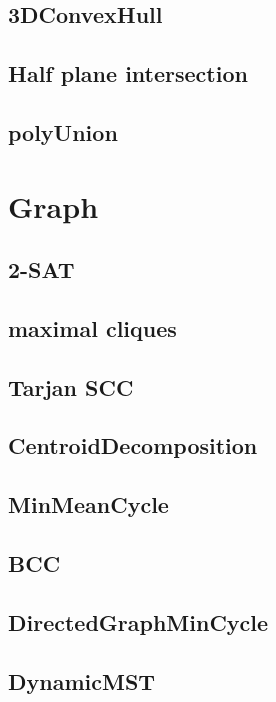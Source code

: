 \subsection{3DConvexHull}

\subsection{Half plane intersection}

\subsection{polyUnion}



\section{Graph}
\subsection{2-SAT}

\subsection{maximal cliques}

\subsection{Tarjan SCC}

\subsection{CentroidDecomposition}

\subsection{MinMeanCycle}

\subsection{BCC}

\subsection{DirectedGraphMinCycle}

\subsection{DynamicMST}

